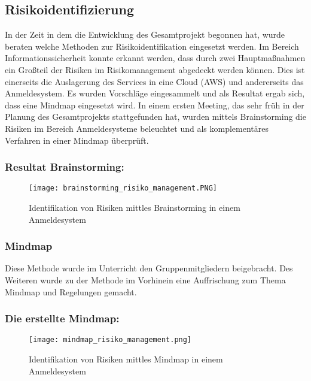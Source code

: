 \subsection{Risikoidentifizierung}
In der Zeit in dem die Entwicklung des Gesamtprojekt begonnen hat, wurde beraten welche Methoden zur Risikoidentifikation eingesetzt werden. Im Bereich Informationssicherheit konnte erkannt werden, dass durch zwei Hauptmaßnahmen ein Großteil der Risiken im Risikomanagement abgedeckt werden können. Dies ist einerseits die Auslagerung des Services in eine Cloud (AWS) und andererseits das Anmeldesystem. Es wurden Vorschläge eingesammelt und als Resultat ergab sich, dass eine Mindmap eingesetzt wird.
In einem ersten Meeting, das sehr früh in der Planung des Gesamtprojekts stattgefunden hat, wurden mittels Brainstorming die Risiken im Bereich Anmeldesysteme beleuchtet und als komplementäres Verfahren in einer Mindmap überprüft.

\subsubsection{Resultat Brainstorming:}
\begin{center}
\begin{figure}[H]
    \centering
    \texttt{[image: brainstorming\_risiko\_management.PNG]}
    \caption{Identifikation von Risiken mittles Brainstorming in einem Anmeldesystem}
\end{figure}
\end{center}

\subsubsection{Mindmap}
Diese Methode wurde im Unterricht den Gruppenmitgliedern beigebracht. Des Weiteren wurde zu der Methode im Vorhinein eine Auffrischung zum Thema Mindmap und Regelungen gemacht.

\subsubsection{Die erstellte Mindmap:}
\begin{center}
\begin{figure}[H]
    \centering
    \texttt{[image: mindmap\_risiko\_management.png]}
    \caption{Identifikation von Risiken mittles Mindmap in einem Anmeldesystem}
\end{figure}
\end{center}

